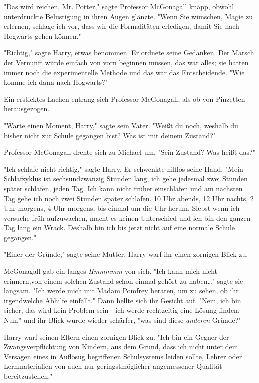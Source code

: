 {"Das wird reichen, Mr. Potter," sagte Professor McGonagall knapp, obwohl unterdrückte Belustigung in ihren Augen glänzte. "Wenn Sie wünschen, Magie zu erlernen, schlage ich vor, dass wir die Formalitäten erledigen, damit Sie nach Hogwarts gehen können."

"Richtig," sagte Harry, etwas benommen. Er ordnete seine Gedanken. Der Marsch der Vernunft würde einfach von vorn beginnen müssen, das war alles; sie hatten immer noch die experimentelle Methode und das war das Entscheidende. "Wie komme ich dann nach Hogwarts?"

Ein ersticktes Lachen entrang sich Professor McGonagall, als ob von Pinzetten herausgezogen.

"Warte einen Moment, Harry," sagte sein Vater. "Weißt du noch, weshalb du bisher nicht zur Schule gegangen bist? Was ist mit deinem Zustand?"

Professor McGonagall drehte sich zu Michael um. "Sein Zustand? Was heißt das?"

"Ich schlafe nicht richtig," sagte Harry. Er schwenkte hilflos seine Hand. "Mein Schlafzyklus ist sechsundzwanzig Stunden lang, ich gehe jedesmal zwei Stunden später schlafen, jeden Tag. Ich kann nicht früher einschlafen und am nächsten Tag gehe ich noch zwei Stunden später schlafen. 10 Uhr abends, 12 Uhr nachts, 2 Uhr morgens, 4 Uhr morgens, bis einmal um die Uhr herum. Slebst wenn ich versuche früh aufzuwachen, macht es keinen Unterschied und ich bin den ganzen Tag lang ein Wrack. Deshalb bin ich bis jetzt nicht auf eine normale Schule gegangen."

"Einer der Gründe," sagte seine Mutter. Harry warf ihr einen zornigen Blick zu.

McGonagall gab ein langes \emph{Hmmmmm} von sich. "Ich kann mich nicht erinnern,von einem solchen Zustand schon einmal gehört zu haben…" sagte sie langsam. "Ich werde mich mit Madam Pomfrey beraten, um zu sehen, ob ihr irgendwelche Abhilfe einfällt." Dann hellte sich ihr Gesicht auf. "Nein, ich bin sicher, das wird kein Problem sein - ich werde rechtzeitig eine Lösung finden. Nun," und ihr Blick wurde wieder schärfer, "was sind diese \emph{anderen} Gründe?"

Harry warf seinen Eltern einen zornigen Blick zu. "Ich bin ein Gegner der Zwangsverpflichtung von Kindern, aus dem Grund, dass ich nicht unter dem Versagen eines in Auflösug begriffenen Schulsystems leiden sollte, Lehrer oder Lernmaterialien von auch nur geringstmöglicher angemessener Qualität bereitzustellen."

}
